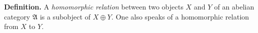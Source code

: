 \textbf{Definition.} A \textit{homomorphic relation} between two objects $X$ and $Y$ of an abelian category $\mathfrak{A}$ is a subobject of $X \oplus Y$. One also speaks of a homomorphic relation from $X$ to $Y$.
